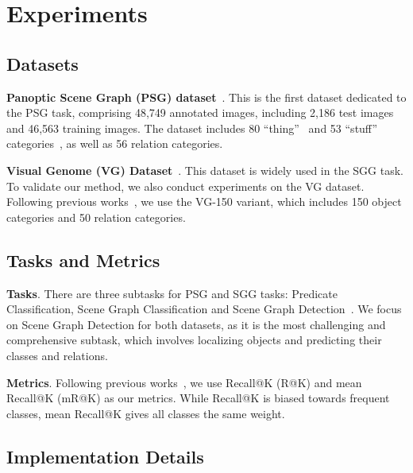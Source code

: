 \section{Experiments}
\label{vlprompt:sec:experiments}


\subsection{Datasets}

\textbf{Panoptic Scene Graph (PSG) dataset}~\citep{yang2022panoptic}.
This is the first dataset dedicated to the PSG task, comprising 48,749 annotated images, including 2,186 test images and 46,563 training images.
The dataset includes 80 ``thing''~\citep{lin2014microsoft} and 53 ``stuff'' categories~\citep{caesar2018coco}, as well as 56 relation categories.

\noindent \textbf{Visual Genome (VG) Dataset}~\citep{krishna2017visual}.
This dataset is widely used in the SGG task.
To validate our method, we also conduct experiments on the VG dataset.
Following previous works~\citep{zellers2018neural, chen2019counterfactual}, we use the VG-150 variant, which includes 150 object categories and 50 relation categories.


\subsection{Tasks and Metrics}

\noindent \textbf{Tasks}.
There are three subtasks for PSG and SGG tasks: Predicate Classification, Scene Graph Classification and Scene Graph Detection~\citep{xu2017scene}.
We focus on Scene Graph Detection for both datasets, as it is the most challenging and comprehensive subtask, which involves localizing objects and predicting their classes and relations.

\noindent \textbf{Metrics}.
Following previous works~\citep{yang2022panoptic, zhou2023hilo, wang2023pair}, we use Recall@K (R@K) and mean Recall@K (mR@K) as our metrics.
While Recall@K is biased towards frequent classes, mean Recall@K gives all classes the same weight.


\subsection{Implementation Details}


